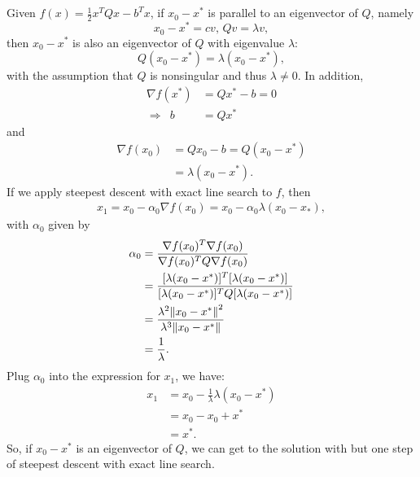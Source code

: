 \documentclass[11pt]{article}
\begin{document}
\section{}
Given $f(x) = \frac12x^TQx-b^Tx$, if $x_0-x^*$ is parallel to an eigenvector of $Q$, namely 
$$x_0 - x^* = cv,\, Qv = \lambda v,$$
then $x_0 - x^*$ is also an eigenvector of $Q$ with eigenvalue $\lambda$:
$$Q(x_0-x^*) = \lambda(x_0-x^*),$$ with the assumption that $Q$ is nonsingular and thus $\lambda\neq0.$ In addition,
\begin{equation}\begin{split} \nabla f(x^*) &= Qx^*-b = 0 \\ \Rightarrow\,\,\, b &= Qx^* \end{split}\nonumber\end{equation} 
and
\begin{equation}\begin{split} \nabla f(x_0) &= Qx_0-b = Q(x_0-x^*)\\&=\lambda(x_0-x^*).\end{split}\nonumber\end{equation} 
If we apply steepest descent with exact line search to $f$, then
\begin{equation}\begin{split} x_1 = x_0 - \alpha_0\nabla f(x_0) = x_0 - \alpha_0\lambda(x_0-x_*),\end{split}\nonumber\end{equation}
with $\alpha_0$ given by
\begin{equation}\begin{split}\alpha_0 &= \frac{\nabla f(x_0)^T\nabla f(x_0)}{\nabla f(x_0)^TQ\nabla f(x_0)} \\
&= \frac{[\lambda(x_0-x^*)]^T[\lambda(x_0-x^*)]}{[\lambda(x_0-x^*)]^TQ[\lambda(x_0-x^*)]}\\
&= \frac{\lambda^2\norm{x_0-x^*}^2}{\lambda^3\norm{x_0-x^*}}\\
&= \frac1{\lambda}.
\end{split}\nonumber\end{equation}
Plug $\alpha_0$ into the expression for $x_1$, we have:
\begin{equation}\begin{split} 
x_1 &= x_0 -\frac1{\lambda}\lambda(x_0-x^*)\\
&=x_0 - x_0 + x^*\\
&=x^*.
\end{split}\nonumber\end{equation} 
So, if $x_0-x^*$ is an eigenvector of $Q$, we can get to the solution with but one step of steepest descent with exact line search.
\end{document}
